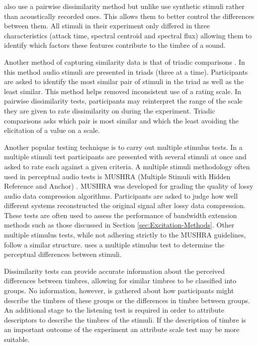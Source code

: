 			\citet{caclin2005acoustic} also use a pairwise dissimilarity method but unlike
			\citet{grey1977multidimensional} use synthetic stimuli rather than acoustically recorded ones. This
			allows them to better control the differences between them. All stimuli in their experiment only
			differed in three characteristics (attack time, spectral centroid and spectral flux) allowing them
			to identify which factors these features contribute to the timbre of a sound.

			Another method of capturing similarity data is that of triadic comparisons
			\citep{wickelmaier2007deriving}. In this method audio stimuli are presented in triads (three at a
			time). Participants are asked to identify the most similar pair of stimuli in the triad as well as
			the least similar. This method helps removed inconsistent use of a rating scale. In pairwise
			dissimilarity tests, participants may reinterpret the range of the scale they are given to rate
			dissimilarity on during the experiment. Triadic comparisons asks which pair is most similar and
			which the least avoiding the elicitation of a value on a scale.

			Another popular testing technique is to carry out multiple stimulus tests. In a multiple stimuli
			test participants are presented with several stimuli at once and asked to rate each against a given
			criteria. A multiple stimuli methodology often used in perceptual audio tests is MUSHRA (Multiple
			Stimuli with Hidden Reference and Anchor) \citep{mushra2014}. MUSHRA was developed for grading the
			quality of lossy audio data compression algorithms. Participants are asked to judge how well
			different systems reconstructed the original signal after lossy data compression.  These tests are
			often used to assess the performance of bandwidth extension methods such as those discussed in
			Section \ref{sec:Excitation-Methods}. Other multiple stimulus tests, while not adhering strictly to
			the MUSHRA guidelines, follow a similar structure. \citet{arthi2015influence} uses a multiple
			stimulus test to determine the perceptual differences between stimuli. 
			
			Dissimilarity tests can provide accurate information about the perceived differences between
			timbres, allowing for similar timbres to be classified into groups. No information, however, is
			gathered about how participants might describe the timbres of these groups or the differences in
			timbre between groups. An additional stage to the listening test is required in order to attribute
			descriptors to describe the timbres of the stimuli. If the description of timbre is an important
			outcome of the experiment an attribute scale test may be more suitable.
			
